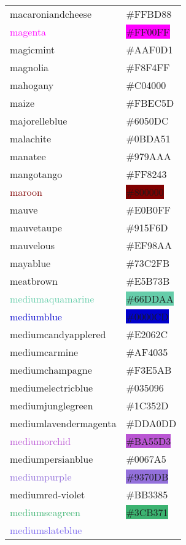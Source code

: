 \documentclass[
]{article}
\begin{document}
\begin{longtable}[]{@{}ll@{}}
\textcolor{macaroniandcheese}{macaroniandcheese} &
\colorbox{macaroniandcheese}{\#FFBD88}\tabularnewline
\textcolor{magenta}{magenta} &
\colorbox{fuchsia}{\#FF00FF}\tabularnewline
\textcolor{magicmint}{magicmint} &
\colorbox{magicmint}{\#AAF0D1}\tabularnewline
\textcolor{magnolia}{magnolia} &
\colorbox{magnolia}{\#F8F4FF}\tabularnewline
\textcolor{mahogany}{mahogany} &
\colorbox{mahogany}{\#C04000}\tabularnewline
\textcolor{maize}{maize} & \colorbox{corn}{\#FBEC5D}\tabularnewline
\textcolor{majorelleblue}{majorelleblue} &
\colorbox{majorelleblue}{\#6050DC}\tabularnewline
\textcolor{malachite}{malachite} &
\colorbox{malachite}{\#0BDA51}\tabularnewline
\textcolor{manatee}{manatee} &
\colorbox{manatee}{\#979AAA}\tabularnewline
\textcolor{mangotango}{mangotango} &
\colorbox{mangotango}{\#FF8243}\tabularnewline
\textcolor{maroon}{maroon} & \colorbox{maroon}{\#800000}\tabularnewline
\textcolor{mauve}{mauve} & \colorbox{mauve}{\#E0B0FF}\tabularnewline
\textcolor{mauvetaupe}{mauvetaupe} &
\colorbox{mauvetaupe}{\#915F6D}\tabularnewline
\textcolor{mauvelous}{mauvelous} &
\colorbox{mauvelous}{\#EF98AA}\tabularnewline
\textcolor{mayablue}{mayablue} &
\colorbox{mayablue}{\#73C2FB}\tabularnewline
\textcolor{meatbrown}{meatbrown} &
\colorbox{meatbrown}{\#E5B73B}\tabularnewline
\textcolor{mediumaquamarine}{mediumaquamarine} &
\colorbox{mediumaquamarine}{\#66DDAA}\tabularnewline
\textcolor{mediumblue}{mediumblue} &
\colorbox{mediumblue}{\#0000CD}\tabularnewline
\textcolor{mediumcandyapplered}{mediumcandyapplered} &
\colorbox{mediumcandyapplered}{\#E2062C}\tabularnewline
\textcolor{mediumcarmine}{mediumcarmine} &
\colorbox{mediumcarmine}{\#AF4035}\tabularnewline
\textcolor{mediumchampagne}{mediumchampagne} &
\colorbox{mediumchampagne}{\#F3E5AB}\tabularnewline
\textcolor{mediumelectricblue}{mediumelectricblue} &
\colorbox{mediumelectricblue}{\#035096}\tabularnewline
\textcolor{mediumjunglegreen}{mediumjunglegreen} &
\colorbox{mediumjunglegreen}{\#1C352D}\tabularnewline
\textcolor{mediumlavendermagenta}{mediumlavendermagenta} &
\colorbox{mediumlavendermagenta}{\#DDA0DD}\tabularnewline
\textcolor{mediumorchid}{mediumorchid} &
\colorbox{mediumorchid}{\#BA55D3}\tabularnewline
\textcolor{mediumpersianblue}{mediumpersianblue} &
\colorbox{mediumpersianblue}{\#0067A5}\tabularnewline
\textcolor{mediumpurple}{mediumpurple} &
\colorbox{mediumpurple}{\#9370DB}\tabularnewline
\textcolor{mediumred-violet}{mediumred-violet} &
\colorbox{mediumred-violet}{\#BB3385}\tabularnewline
\textcolor{mediumseagreen}{mediumseagreen} &
\colorbox{mediumseagreen}{\#3CB371}\tabularnewline
\textcolor{mediumslateblue}{mediumslateblue} &

\end{longtable}
\end{document}
